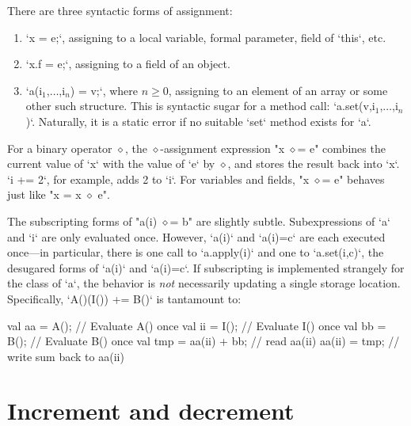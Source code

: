 There are three syntactic forms of
assignment: 
\begin{enumerate}
\item \xcd`x = e;`, assigning to a local variable, formal parameter, field of
      \xcd`this`, etc. 
\item \xcd`x.f = e;`, assigning to a field of an object.
\item \xcdmath`a(i$_1$,$\ldots$,i$_n$) = v;`, where {$n \ge 0$}, assigning to
      an element of an array or some other such structure. This is syntactic
      sugar for a method call: \xcdmath`a.set(v,i$_1$,$\ldots$,i$_n$)`.
      Naturally, it is a static error if no suitable \xcd`set` method exists
      for \xcd`a`.
\end{enumerate}

For a binary operator $\diamond$, the $\diamond$-assignment expression
\xcdmath"x $\diamond$= e" combines the current value of \xcd`x` with the value
of \xcd`e` by {$\diamond$}, and stores the result back into \xcd`x`.  
\xcd`i += 2`, for example, adds 2 to \xcd`i`. For variables and fields, 
\xcdmath"x $\diamond$= e" behaves just like \xcdmath"x = x $\diamond$ e". 

The subscripting forms of \xcdmath"a(i) $\diamond$= b" are slightly subtle.
Subexpressions of \xcd`a` and \xcd`i` are only evaluated once.  However,
\xcd`a(i)` and \xcd`a(i)=c` are each executed once---in particular, there is
one call to \xcd`a.apply(i)` and one to \xcd`a.set(i,c)`, the desugared forms
of \xcd`a(i)` and \xcd`a(i)=c`.  If subscripting is implemented strangely for
the class of \xcd`a`, the behavior is {\em not} necessarily updating a single
storage location. Specifically, \xcd`A()(I()) += B()` is tantamount to: 
\begin{xten}
{
  val aa = A();  // Evaluate A() once
  val ii = I();  // Evaluate I() once
  val bb = B();  // Evaluate B() once
  val tmp = aa(ii) + bb; // read aa(ii)
  aa(ii) = tmp;  // write sum back to aa(ii)
}
\end{xten}





\section{Increment and decrement}


